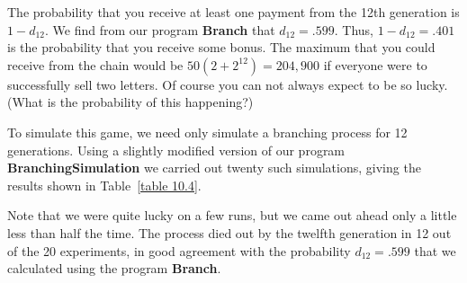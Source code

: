 \begin{example}
The probability that you receive at least one payment from the 12th generation
is $1 - d_{12}$.  We find from our program {\bf Branch} that $d_{12} =
.599$.  Thus, $1 - d_{12} = .401$ is the probability that you receive some
bonus.  The maximum that you could receive from the chain would be $50(2 +
2^{12}) = 204{,}900$ if everyone were to successfully sell two letters.  Of
course you can not always expect to be so lucky.  (What is the probability of
this happening?)

To simulate this game, we need only simulate a branching process for 12
generations.  Using a slightly modified version of our program {\bf
BranchingSimulation} we carried out twenty such simulations, giving the
 results shown in Table~\ref{table 10.4}.

Note that we were quite lucky on a few runs, but we came out ahead only a
little less than half the time.  The process died out by the twelfth generation
in 12 out of the 20 experiments, in good agreement with the probability $d_{12}
= .599$ that we calculated using the program {\bf Branch}.


\end{example}
